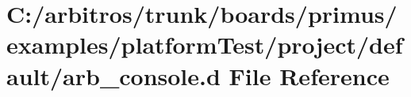\hypertarget{boards_2primus_2examples_2platform_test_2project_2default_2arb__console_8d}{\section{C\-:/arbitros/trunk/boards/primus/examples/platform\-Test/project/default/arb\-\_\-console.d File Reference}
\label{boards_2primus_2examples_2platform_test_2project_2default_2arb__console_8d}
}
